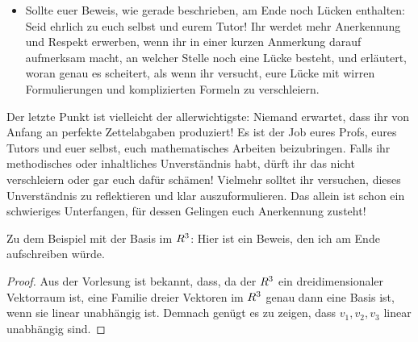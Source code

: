 \begin{phasethree}[Aufschreiben]
\begin{itemize}
        \item Sollte euer Beweis, wie gerade beschrieben, am Ende noch Lücken enthalten: Seid ehrlich zu euch selbst und eurem Tutor! Ihr werdet mehr Anerkennung und Respekt erwerben, wenn ihr in einer kurzen Anmerkung darauf aufmerksam macht, an welcher Stelle noch eine Lücke besteht, und erläutert, woran genau es scheitert, als wenn ihr versucht, eure Lücke mit wirren Formulierungen und komplizierten Formeln zu verschleiern.
    \end{itemize}
    Der letzte Punkt ist vielleicht der allerwichtigste: Niemand erwartet, dass ihr von Anfang an perfekte Zettelabgaben produziert! Es ist der Job eures Profs,  eures Tutors und euer selbst, euch mathematisches Arbeiten beizubringen. Falls ihr methodisches oder inhaltliches Unverständnis habt, dürft ihr das nicht verschleiern oder gar euch dafür schämen! Vielmehr solltet ihr versuchen, dieses Unverständnis zu reflektieren und klar auszuformulieren. Das allein ist schon ein schwieriges Unterfangen, für dessen Gelingen euch Anerkennung zusteht!

    Zu dem Beispiel mit der Basis im $\relax R^3$: Hier ist ein Beweis, den ich am Ende aufschreiben würde.
    \begin{proof}
        Aus der Vorlesung ist bekannt, dass, da der $\relax R^3$ ein dreidimensionaler Vektorraum ist, eine Familie dreier Vektoren im $\relax R^3$ genau dann eine Basis ist, wenn sie linear unabhängig ist. Demnach genügt es zu zeigen, dass $v_1,v_2,v_3$ linear unabhängig sind.


\end{proof}
\end{phasethree}
